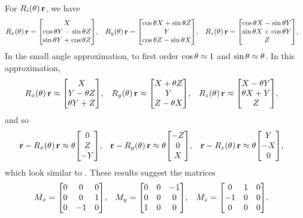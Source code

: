 \begin{solution}
	For $R_i(\theta) \, \mathbf{r}$, we have
	\begin{align*}
		\Rxt \, \vr &= \mqty[ X \\ \cost Y - \sint Z \\ \sint Y + \cost Z ], &
		\Ryt \, \vr &= \mqty[ \cost X + \sint Z \\ Y \\ \cost Z - \sint X ], &
		\Rzt \, \vr &= \mqty[ \cost X - \sint Y \\ \sint X + \cost Y \\ Z ],
	\end{align*}
	In the small angle approximation, to first order $\cos{\theta} \approx 1$ and $\sin{\theta} \approx \theta$.  In this approximation,
	\begin{align*}
		\Rxt \, \vr &\approx \mqty[ X \\ Y - \theta Z \\ \theta Y + Z ], &
		\Ryt \, \vr &\approx \mqty[ X + \theta Z \\ Y \\ Z - \theta X ], &
		\Rzt \, \vr &\approx \mqty[ X - \theta Y \\ \theta X + Y \\ Z ],
	\end{align*}
	and so
	\begin{align*}
		\vr - \Rxt \, \vr &\approx \theta \mqty[ 0 \\ Z \\ -Y ], &
		\vr - \Ryt \, \vr &\approx \theta \mqty[ -Z \\ 0 \\ X ], &
		\vr - \Rzt \, \vr &\approx \theta \mqty[ Y \\ -X \\ 0 ],
	\end{align*}
	which look similar to .  These results suggest the matrices
	\begin{align*}
		\Mx &= \mqty[ 0 & 0 & 0 \\ 0 & 0 & 1 \\ 0 & -1 & 0 ], &
		\My &= \mqty[ 0 & 0 & -1 \\ 0 & 0 & 0 \\ 1 & 0 & 0 ], &
		\Mz &= \mqty[ 0 & 1 & 0 \\ -1 & 0 & 0 \\ 0 & 0 & 0 ].
	\end{align*}
\end{solution}

\newcommand{\klm}{\ket{l, m}}

